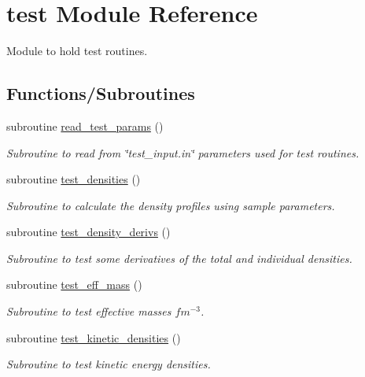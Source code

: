 \hypertarget{namespacetest}{}\section{test Module Reference}
\label{namespacetest}


Module to hold test routines.  


\subsection*{Functions/\+Subroutines}
\begin{DoxyCompactItemize}
\item 
subroutine \mbox{\hyperlink{namespacetest_a2d72f655d80bac0b01030b9cbda3518f}{read\+\_\+test\+\_\+params}} ()
\begin{DoxyCompactList}\small\item\em Subroutine to read from \char`\"{}test\+\_\+input.\+in\char`\"{} parameters used for test routines. \end{DoxyCompactList}\item 
subroutine \mbox{\hyperlink{namespacetest_ac81b1d59a968470b8ef8a165101df52c}{test\+\_\+densities}} ()
\begin{DoxyCompactList}\small\item\em Subroutine to calculate the density profiles using sample parameters. \end{DoxyCompactList}\item 
subroutine \mbox{\hyperlink{namespacetest_a50469f436f9c4caa447dafc48e311558}{test\+\_\+density\+\_\+derivs}} ()
\begin{DoxyCompactList}\small\item\em Subroutine to test some derivatives of the total and individual densities. \end{DoxyCompactList}\item 
subroutine \mbox{\hyperlink{namespacetest_ac49b81619b874cdd8276af19d24675cc}{test\+\_\+eff\+\_\+mass}} ()
\begin{DoxyCompactList}\small\item\em Subroutine to test effective masses $fm^{-3}$. \end{DoxyCompactList}\item 
subroutine \mbox{\hyperlink{namespacetest_a377babe07d6ab6f0791233afee079582}{test\+\_\+kinetic\+\_\+densities}} ()
\begin{DoxyCompactList}\small\item\em Subroutine to test kinetic energy densities. \end{DoxyCompactList}\item 

\end{DoxyCompactItemize}
